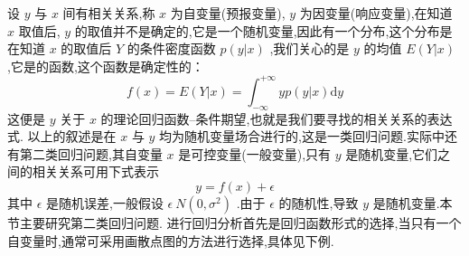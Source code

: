 设 $ y $ 与 $ x $ 间有相关关系,称 $ x $ 为自变量(预报变量), $ y $ 为因变量(响应变量),在知道 $ x $ 取值后, $ y $ 的取值并不是确定的,它是一个随机变量,因此有一个分布,这个分布是在知道 $ x $ 的取值后 $ Y $ 的条件密度函数 $p(y|x) $ ,我们关心的是 $  y $ 的均值 $ E(Y|x)  $ ,它是的函数,这个函数是确定性的：
\begin{equation}
f(x)=E(Y | x)=\int_{-\infty}^{+\infty} y p(y | x) \mathrm{d} y
\end{equation}
这便是 $  y $ 关于 $  x $ 的理论回归函数--条件期望,也就是我们要寻找的相关关系的表达式.
以上的叙述是在 $  x $ 与 $  y $ 均为随机变量场合进行的,这是一类回归问题.实际中还有第二类回归问题,其自变量 $  x $ 是可控变量(一般变量),只有 $  y $ 是随机变量,它们之间的相关关系可用下式表示
\[
y=f(x)+\epsilon
\]
其中 $ \epsilon  $ 是随机误差,一般假设 $ \epsilon ~N(0,\sigma^2) $ .由于 $ \epsilon  $ 的随机性,导致 $  y $ 是随机变量.本节主要研究第二类回归问题.
进行回归分析首先是回归函数形式的选择,当只有一个自变量时,通常可采用画散点图的方法进行选择,具体见下例.
